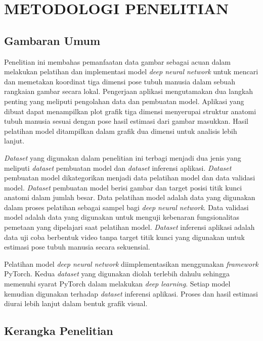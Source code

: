 
\chapter{METODOLOGI PENELITIAN}
\label{cha:3-MetodologiPenelitian}

\section{Gambaran Umum} \label{sec:3-GambaranUmum}

Penelitian ini membahas pemanfaatan data gambar sebagai acuan dalam melakukan pelatihan dan
implementasi model \textit{deep neural network} untuk mencari dan memetakan koordinat tiga dimensi
pose tubuh manusia dalam sebuah rangkaian gambar secara lokal. Pengerjaan aplikasi mengutamakan dua
langkah penting yang meliputi pengolahan data dan pembuatan model. Aplikasi yang dibuat dapat menampilkan
plot grafik tiga dimensi menyerupai struktur anatomi tubuh manusia sesuai dengan pose hasil
estimasi dari gambar masukkan. Hasil pelatihan model ditampilkan dalam grafik dua dimensi untuk
analisis lebih lanjut.

\textit{Dataset} yang digunakan dalam penelitian ini terbagi menjadi dua jenis yang meliputi
\textit{dataset} pembuatan model dan \textit{dataset} inferensi aplikasi.
\textit{Dataset} pembuatan model dikategorikan menjadi data pelatihan model dan data validasi model.
\textit{Dataset} pembuatan model berisi gambar dan target posisi titik kunci anatomi dalam jumlah besar.
Data pelatihan model adalah data yang digunakan dalam proses pelatihan sebagai sampel bagi \textit{deep neural network}.
Data validasi model adalah data yang digunakan untuk menguji kebenaran fungsionalitas pemetaan yang
dipelajari saat pelatihan model. \textit{Dataset} inferensi aplikasi adalah data uji coba berbentuk
video tanpa target titik kunci yang digunakan untuk estimasi pose tubuh manusia secara sekuensial.

Pelatihan model \textit{deep neural network} diimplementasikan menggunakan \textit{framework} PyTorch.
Kedua \textit{dataset} yang digunakan diolah terlebih dahulu sehingga memenuhi syarat PyTorch dalam melakukan
\textit{deep learning}.
Setiap model kemudian digunakan terhadap \textit{dataset} inferensi
aplikasi. Proses dan hasil estimasi diurai lebih lanjut dalam bentuk grafik visual.

\section{Kerangka Penelitian} \label{sec:3-KerangkaPenelitian}

